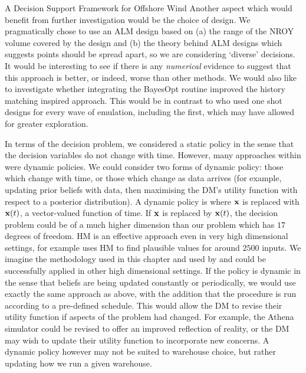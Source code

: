\begin{chapter}{A Decision Support Framework for Offshore Wind \label{Ch:ds-for-ow}}
Another aspect which would benefit from further investigation would be the choice of design. We pragmatically chose to use an ALM design based on (a) the range of the NROY volume covered by the design and (b) the theory behind ALM designs which suggests points should be spread apart, so we are considering `diverse' decisions. It would be interesting to see if there is any \textit{numerical} evidence to suggest that this approach is better, or indeed, worse than other methods. We would also like to investigate whether integrating the BayesOpt routine improved the history matching inspired approach. This would be in contrast to \citet{Owen2020} who used one shot designs for every wave of emulation, including the first, which may have allowed for greater exploration.

In terms of the decision problem, we considered a static policy in the sense that the decision variables do not change with time. However, many approaches within \citet{Tusar2022} were dynamic policies. We could consider two forms of dynamic policy: those which change with time, or those which change as data arrives (for example, updating prior beliefs with data, then maximising the DM's utility function with respect to a posterior distribution). A dynamic policy is where $\mathbf{x}$ is replaced with $\mathbf{x}(t)$, a vector-valued function of time. If $\mathbf{x}$ is replaced by $\mathbf{x}(t)$, the decision problem could be of a much higher dimension than our problem which has $17$ degrees of freedom. HM is an effective approach even in very high dimensional settings, for example \citet{White2018} uses HM to find plausible values for around $2500$ inputs. We imagine the methodology used in this chapter and used by \citet{Lawson2016} and \citet{Owen2020} could be successfully applied in other high dimensional settings. If the policy is dynamic in the sense that beliefs are being updated constantly or periodically, we would use exactly the same approach as above, with the addition that the procedure is run according to a pre-defined schedule. This would allow the DM to revise their utility function if aspects of the problem had changed. For example, the Athena simulator could be revised to offer an improved reflection of reality, or the DM may wish to update their utility function to incorporate new concerns. A dynamic policy however may not be suited to warehouse choice, but rather updating how we run a given warehouse.
\end{chapter}
